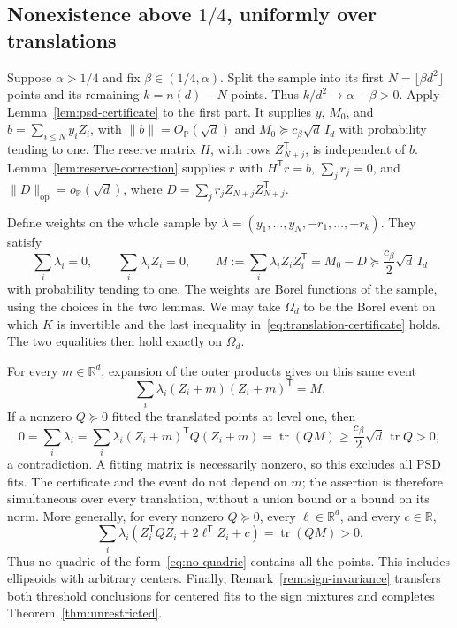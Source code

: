 \documentclass[11pt]{article}
\newcommand{\R}{\mathbb R}
\newcommand{\Pbb}{\mathbb P}
\DeclareMathOperator{\tr}{tr}
\newcommand{\opnorm}[1]{\lVert#1\rVert_{\mathrm{op}}}
\newcommand{\norm}[1]{\lVert#1\rVert}
\newcommand{\OP}{O_{\Pbb}}
\theoremstyle{remark}
\begin{document}
\subsection{Nonexistence above \texorpdfstring{$1/4$}{1/4}, uniformly over translations}

Suppose $\alpha>1/4$ and fix $\beta\in(1/4,\alpha)$. Split the sample
into its first $N=\lfloor\beta d^2\rfloor$ points and its remaining
$k=n(d)-N$ points. Thus $k/d^2\to\alpha-\beta>0$.
Apply Lemma~\ref{lem:psd-certificate} to the first part. It supplies
$y$, $M_0$, and $b=\sum_{i\le N}y_iZ_i$, with
$\norm b=\OP(\sqrt d)$ and
$M_0\succeq c_\beta\sqrt d\,I_d$ with probability tending to one.
The reserve matrix $H$, with rows $Z_{N+j}^{\mathsf T}$, is independent
of $b$. Lemma~\ref{lem:reserve-correction} supplies $r$ with
$H^{\mathsf T}r=b$, $\sum_jr_j=0$, and
$\opnorm D=o_{\Pbb}(\sqrt d)$, where
$D=\sum_jr_jZ_{N+j}Z_{N+j}^{\mathsf T}$.

Define weights on the whole sample by
$\lambda=(y_1,\ldots,y_N,-r_1,\ldots,-r_k)$. They satisfy
\begin{equation}\label{eq:translation-certificate}
 \sum_i\lambda_i=0,\qquad \sum_i\lambda_iZ_i=0,\qquad
 M:=\sum_i\lambda_iZ_iZ_i^{\mathsf T}=M_0-D
       \succeq\frac{c_\beta}{2}\sqrt d\,I_d
\end{equation}
with probability tending to one. The weights are Borel functions of the
sample, using the choices in the two lemmas. We may take $\Omega_d$ to
be the Borel event on which $K$ is invertible and the last inequality
in~\eqref{eq:translation-certificate} holds. The two equalities then
hold exactly on $\Omega_d$.

For every $m\in\R^d$, expansion of the outer products gives on this
same event
\begin{equation}\label{eq:translation-cancellation}
 \sum_i\lambda_i(Z_i+m)(Z_i+m)^{\mathsf T}=M.
\end{equation}
If a nonzero $Q\succeq0$ fitted the translated points at level one,
then
\[
 0=\sum_i\lambda_i
  =\sum_i\lambda_i(Z_i+m)^{\mathsf T}Q(Z_i+m)
  =\tr(QM)
  \ge\frac{c_\beta}{2}\sqrt d\,\tr Q>0,
\]
a contradiction. A fitting matrix is necessarily nonzero, so this
excludes all PSD fits. The certificate and the event do not depend on
$m$; the assertion is therefore simultaneous over every translation,
without a union bound or a bound on its norm. More generally, for every
nonzero $Q\succeq0$, every $\ell\in\R^d$, and every $c\in\R$,
\[
 \sum_i\lambda_i
   (Z_i^{\mathsf T}QZ_i+2\ell^{\mathsf T}Z_i+c)
 =\tr(QM)>0.
\]
Thus no quadric of the form~\eqref{eq:no-quadric} contains all the
points. This includes ellipsoids with arbitrary centers. Finally,
Remark~\ref{rem:sign-invariance} transfers both threshold conclusions
for centered fits to the sign mixtures and completes
Theorem~\ref{thm:unrestricted}.
\end{document}
